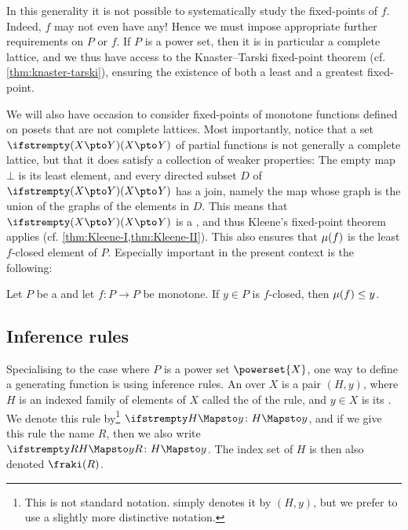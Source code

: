 In this generality it is not possible to systematically study the fixed-points of $f$. Indeed, $f$ may not even have any! Hence we must impose appropriate further requirements on $P$ or $f$. If $P$ is a power set, then it is in particular a complete lattice, and we thus have access to the Knaster--Tarski fixed-point theorem (cf. \cref{thm:knaster-tarski}), ensuring the existence of both a least and a greatest fixed-point.

We will also have occasion to consider fixed-points of monotone functions defined on posets that are not complete lattices. Most importantly, notice that a set $\pmaps{X}{Y}$ of partial functions is not generally a complete lattice, but that it does satisfy a collection of weaker properties: The empty map $\bot$ is its least element, and every directed subset $D$ of $\pmaps{X}{Y}$ has a join, namely the map whose graph is the union of the graphs of the elements in $D$. This means that $\pmaps{X}{Y}$ is a \dCPPO{}, and thus Kleene's fixed-point theorem applies (cf. \cref{thm:Kleene-I,thm:Kleene-II}). This also ensures that $\lfp{f}$ is the least $f$-closed element of $P$. Especially important in the present context is the following:

\begin{corollarynoproof}
    \label{cor:induction-abstract}
    Let $P$ be a \dCPPO{} and let $f \colon P \to P$ be monotone. If $y \in P$ is $f$-closed, then $\lfp{f} \leq y$.
\end{corollarynoproof}


\subsection{Inference rules}\label{sec:inference-rules}

Specialising to the case where $P$ is a power set $\powerset{X}$, one way to define a generating function is using inference rules. An  over $X$ is a pair $(H,y)$, where $H$ is an indexed family of elements of $X$ called the  of the rule, and $y \in X$ is its . We denote this rule by\footnote{This is not standard notation. \textcite[§7.1]{pitts-nominal-sets} simply denotes it by $(H,y)$, but we prefer to use a slightly more distinctive notation.} $\myinfrule{}{H}{y}$, and if we give this rule the name $R$, then we also write $\myinfrule{R}{H}{y}$. The index set of $H$ is then also denoted $\idxset{R}$.

